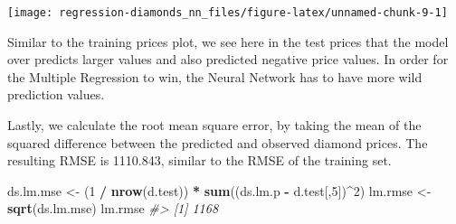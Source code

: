 \documentclass[]{book}
\newenvironment{Shaded}{\begin{snugshade}}{\end{snugshade}}
\newcommand{\CommentTok}[1]{\textcolor[rgb]{0.56,0.35,0.01}{\textit{#1}}}
\newcommand{\DataTypeTok}[1]{\textcolor[rgb]{0.13,0.29,0.53}{#1}}
\newcommand{\DecValTok}[1]{\textcolor[rgb]{0.00,0.00,0.81}{#1}}
\newcommand{\FloatTok}[1]{\textcolor[rgb]{0.00,0.00,0.81}{#1}}
\newcommand{\KeywordTok}[1]{\textcolor[rgb]{0.13,0.29,0.53}{\textbf{#1}}}
\newcommand{\NormalTok}[1]{#1}
\newcommand{\OperatorTok}[1]{\textcolor[rgb]{0.81,0.36,0.00}{\textbf{#1}}}
\newcommand{\StringTok}[1]{\textcolor[rgb]{0.31,0.60,0.02}{#1}}
\begin{document}
\begin{Shaded}
\end{Shaded}

\begin{center}\texttt{[image: regression-diamonds\_nn\_files/figure-latex/unnamed-chunk-9-1]} \end{center}

Similar to the training prices plot, we see here in the test prices that the model over predicts larger values and also predicted negative price values. In order for the Multiple Regression to win, the Neural Network has to have more wild prediction values.

Lastly, we calculate the root mean square error, by taking the mean of the squared difference between the predicted and observed diamond prices. The resulting RMSE is 1110.843, similar to the RMSE of the training set.

\begin{Shaded}
\begin{Highlighting}[]
\NormalTok{ds.lm.mse <-}\StringTok{ }\NormalTok{(}\DecValTok{1} \OperatorTok{/}\StringTok{ }\KeywordTok{nrow}\NormalTok{(d.test)) }\OperatorTok{*}\StringTok{ }\KeywordTok{sum}\NormalTok{((ds.lm.p }\OperatorTok{-}\StringTok{ }\NormalTok{d.test[,}\DecValTok{5}\NormalTok{])}\OperatorTok{^}\DecValTok{2}\NormalTok{)}
\NormalTok{lm.rmse <-}\StringTok{ }\KeywordTok{sqrt}\NormalTok{(ds.lm.mse)}
\NormalTok{lm.rmse}
\CommentTok{#> [1] 1168}
\end{Highlighting}
\end{Shaded}
\end{document}
